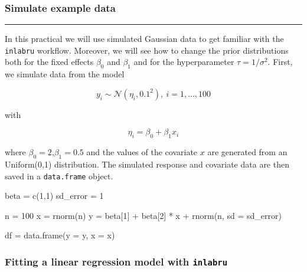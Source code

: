 \documentclass[
  letterpaper,
  DIV=11,
  numbers=noendperiod]{scrartcl}
\newenvironment{Shaded}{\begin{snugshade}}{\end{snugshade}}
\newcommand{\AttributeTok}[1]{\textcolor[rgb]{0.40,0.45,0.13}{#1}}
\newcommand{\DecValTok}[1]{\textcolor[rgb]{0.68,0.00,0.00}{#1}}
\newcommand{\FunctionTok}[1]{\textcolor[rgb]{0.28,0.35,0.67}{#1}}
\newcommand{\NormalTok}[1]{\textcolor[rgb]{0.00,0.23,0.31}{#1}}
\newcommand{\OtherTok}[1]{\textcolor[rgb]{0.00,0.23,0.31}{#1}}
\newcommand{\SpecialCharTok}[1]{\textcolor[rgb]{0.37,0.37,0.37}{#1}}
\begin{document}
\subsubsection{\texorpdfstring{\textbf{Simulate example
data}}{Simulate example data}}\label{simulate-example-data}

\begin{center}\rule{0.5\linewidth}{0.5pt}\end{center}

In this practical we will use simulated Gaussian data to get familiar
with the \texttt{inlabru} workflow. Moreover, we will see how to change
the prior distributions both for the fixed effects \(\beta_0\) and
\(\beta_1\) and for the hyperparameter \(\tau = 1/\sigma^2\). First, we
simulate data from the model

\[
y_i\sim\mathcal{N}(\eta_i,0.1^2), \ i = 1,\dots,100
\]

with

\[
\eta_i = \beta_0 + \beta_1 x_i
\]

where \(\beta_0 = 2\),\(\beta_1 = 0.5\) and the values of the covariate
\(x\) are generated from an Uniform(0,1) distribution. The simulated
response and covariate data are then saved in a \texttt{data.frame}
object.

\begin{Shaded}
\begin{Highlighting}[]
\NormalTok{beta }\OtherTok{=} \FunctionTok{c}\NormalTok{(}\DecValTok{1}\NormalTok{,}\DecValTok{1}\NormalTok{)}
\NormalTok{sd\_error }\OtherTok{=} \DecValTok{1}

\NormalTok{n }\OtherTok{=} \DecValTok{100}
\NormalTok{x }\OtherTok{=} \FunctionTok{rnorm}\NormalTok{(n)}
\NormalTok{y }\OtherTok{=}\NormalTok{ beta[}\DecValTok{1}\NormalTok{] }\SpecialCharTok{+}\NormalTok{ beta[}\DecValTok{2}\NormalTok{] }\SpecialCharTok{*}\NormalTok{ x }\SpecialCharTok{+} \FunctionTok{rnorm}\NormalTok{(n, }\AttributeTok{sd =}\NormalTok{ sd\_error)}

\NormalTok{df }\OtherTok{=} \FunctionTok{data.frame}\NormalTok{(}\AttributeTok{y =}\NormalTok{ y, }\AttributeTok{x =}\NormalTok{ x)  }
\end{Highlighting}
\end{Shaded}

\subsubsection{\texorpdfstring{\textbf{Fitting a linear regression model
with
\texttt{inlabru}}}{Fitting a linear regression model with inlabru}}\label{fitting-a-linear-regression-model-with-inlabru}
\end{document}
